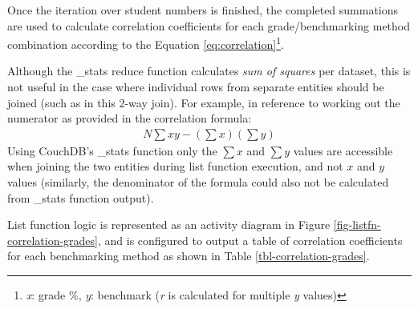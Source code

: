 Once the iteration over student numbers is finished, the completed summations are used to calculate correlation coefficients for each grade/benchmarking method combination according to the Equation \ref{eq:correlation}\footnote{\textit{x}: grade \%, \textit{y}: benchmark (\textit{r} is calculated for multiple \textit{y} values)}.

Although the \_stats reduce function calculates \textit{sum of squares} per dataset, this is not useful in the case where individual rows from separate entities should be joined (such as in this 2-way join). For example, in reference to working out the numerator as provided in the correlation formula:
\begin{align}
    N\sum{xy} - (\sum{x})(\sum{y})
\end{align}
Using CouchDB's \_stats function only the $\sum{x}$ and $\sum{y}$ values are accessible when joining the two entities during list function execution, and not $x$ and $y$ values (similarly, the denominator of the formula could also not be calculated from \_stats function output).

List function logic is represented as an activity diagram in Figure \ref{fig-listfn-correlation-grades}, and is configured to output a table of correlation coefficients for each benchmarking method as shown in Table \ref{tbl-correlation-grades}.


